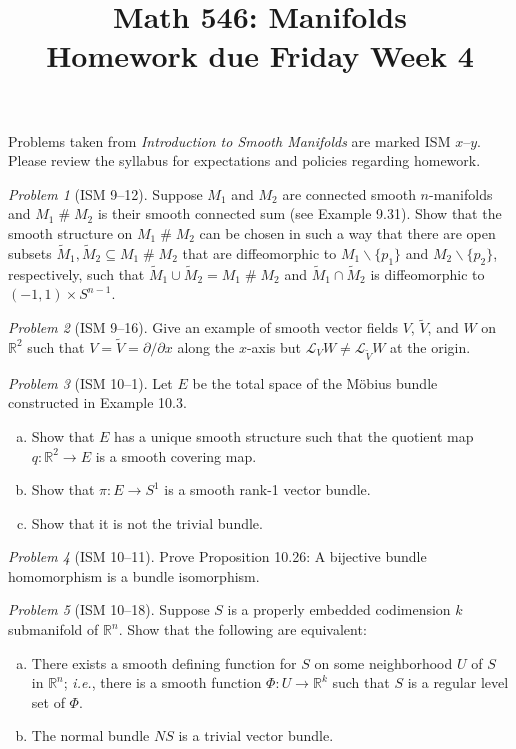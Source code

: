 \documentclass[11pt,twoside]{amsart}
\title{Math 546: Manifolds\\ Homework due Friday Week 4}
\theoremstyle{plain}
\theoremstyle{remark}
\newtheorem{prob}{Problem}
\theoremstyle{definition}
\theoremstyle{definition}
\newcommand{\RR}{\mathbb{R}}
\newcommand{\cs}{\mathbin{\#}}
\begin{document}
\maketitle

\noindent Problems taken from \emph{Introduction to Smooth Manifolds} are marked ISM $x$--$y$. Please review the syllabus for expectations and policies regarding homework.

\begin{prob}[ISM 9--12]
Suppose $M_1$ and $M_2$ are connected smooth $n$-manifolds and $M_1\cs M_2$ is their smooth connected sum (see Example 9.31). Show that the smooth structure on $M_1\cs M_2$ can be chosen in such a way that there are open subsets $\tilde M_1,\tilde M_2\subseteq M_1\cs M_2$ that are diffeomorphic to $M_1\smallsetminus \{p_1\}$ and $M_2\smallsetminus \{p_2\}$, respectively, such that $\tilde M_1\cup \tilde M_2 = M_1\cs M_2$ and $\tilde M_1\cap \tilde M_2$ is diffeomorphic to $(-1,1)\times S^{n-1}$.
\end{prob}

\begin{prob}[ISM 9--16]
Give an example of smooth vector fields $V$, $\tilde V$, and $W$ on $\RR^2$ such that $V = \tilde V=\partial/\partial x$ along the $x$-axis but $\mathscr L_V W\ne \mathscr L_{\tilde V}W$ at the origin.
\end{prob}

\begin{prob}[ISM 10--1]
Let $E$ be the total space of the M\"obius bundle constructed in Example 10.3.
\begin{enumerate}[(a)]
\item Show that $E$ has a unique smooth structure such that the quotient map $q\colon \RR^2\to E$ is a smooth covering map.
\item Show that $\pi\colon E\to S^1$ is a smooth rank-1 vector bundle.
\item Show that it is not the trivial bundle.
\end{enumerate}
\end{prob}

\begin{prob}[ISM 10--11]
Prove Proposition 10.26: A bijective bundle homomorphism is a bundle isomorphism.
\end{prob}

\begin{prob}[ISM 10--18]
Suppose $S$ is a properly embedded codimension $k$ submanifold of $\RR^n$. Show that the following are equivalent:
\begin{enumerate}[(a)]
\item There exists a smooth defining function for $S$ on some neighborhood $U$ of $S$ in $\RR^n$; \emph{i.e.}, there is a smooth function $\Phi\colon U\to \RR^k$ such that $S$ is a regular level set of $\Phi$.
\item The normal bundle $NS$ is a trivial vector bundle.
\end{enumerate}
\end{prob}
\end{document}
